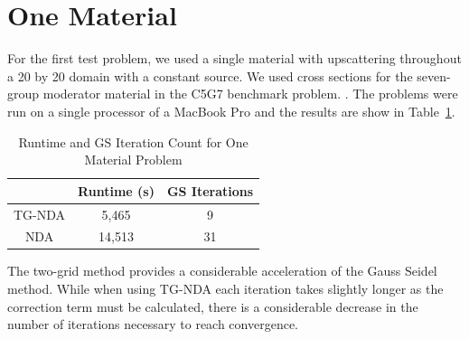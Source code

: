 \section{One Material}
%
For the first test problem, we used a single material with upscattering throughout a 20 by 20
 domain with a constant source. 
 We used cross sections for the seven-group moderator material in the C5G7 benchmark problem. \cite{C5G7}.  
The problems were run on a single processor of a MacBook Pro and the results are show in Table~\ref{tab:onemat}.
\begin{table}[!htb]
\centering
\caption{Runtime and GS Iteration Count for One Material Problem}
    \label{tab:onemat}
\begin{center}
    \begin{tabular}{|c|c|c|}
    \hline
    & Runtime (s) & GS Iterations \\
    \hline
    TG-NDA & 5,465 & 9 \\
    NDA & 14,513 & 31 \\
    \hline
    \end{tabular}
\end{center}
\end{table}
The two-grid method provides a considerable acceleration of the Gauss Seidel method. While when using TG-NDA each iteration takes slightly longer as the correction term must be calculated, there is a considerable decrease in the number of iterations necessary to reach convergence. 

